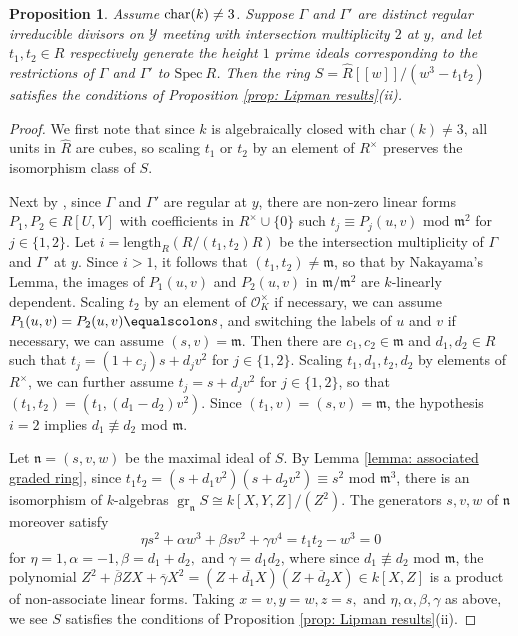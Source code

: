 \documentclass[12pt]{amsart}
\numberwithin{equation}{section}
\newtheorem{prop}[equation]{Proposition}
\theoremstyle{definition}
\newcommand{\n}{\mathfrak{n}}
\renewcommand{\O}{\mathcal{O}}
\newcommand{\Spec}{\mathrm{Spec} \ }
\renewcommand{\c}[1]{\overline{#1}}
\newcommand{\m}{\mathfrak{m}}
\newcommand{\Y}{\mathcal{Y}}
\newcommand{\tx}[1]{\text{#1}}
\DeclareMathOperator{\gr}{gr}
\begin{document}
\begin{prop}\label{prop: rational double points - Type II}
    Assume $\textup{char}(k)\neq 3$. Suppose $\Gamma$ and $\Gamma'$ are distinct regular irreducible divisors on $\Y$ meeting with intersection multiplicity $2$ at $y$, and let $t_1,t_2\in R$ respectively generate the height $1$ prime ideals corresponding to the restrictions of $\Gamma$ and $\Gamma'$ to $\Spec R$. Then the ring $S=\widehat{R}[[w]]/(w^3-t_1t_2)$ satisfies the conditions of Proposition \ref{prop: Lipman results}\textup{(ii)}.
\end{prop}
\begin{proof}
    We first note that since $k$ is algebraically closed with $\tx{char}(k)\neq 3$, all units in $\widehat{R}$ are cubes, so scaling $t_1$ or $t_2$ by an element of $R^\times$ preserves the isomorphism class of $S$.
    
    Next by \cite[Example 9.2.21]{Liu_book}, since $\Gamma$ and $\Gamma'$ are regular at $y$, there are non-zero linear forms $P_1,P_2\in R[U,V]$ with coefficients in $R^\times\cup\{0\}$ such $t_j\equiv P_j(u,v)\tx{ mod }\m^2$ for $j\in\{1,2\}$. Let $i=\tx{length}_R(R/(t_1,t_2)R)$ be the intersection multiplicity of $\Gamma$ and $\Gamma'$ at $y$. Since $i>1$, it follows that $(t_1,t_2)\neq\m$, so that by Nakayama's Lemma, the images of $P_1(u,v)$ and $P_2(u,v)$ in $\m/\m^2$ are $k$-linearly dependent. Scaling $t_2$ by an element of $\O_K^\times$ if necessary, we can assume $P_1(u,v)=P_2(u,v)\equalscolon s$, and switching the labels of $u$ and $v$ if necessary, we can assume $(s,v)=\m$. Then there are $c_1,c_2\in\m$ and $d_1,d_2\in R$ such that $t_j=(1+c_j)s+d_jv^2$ for $j\in\{1,2\}$. Scaling $t_1,d_1,t_2,d_2$ by elements of $R^\times$, we can further assume $t_j=s+d_jv^2$ for $j\in\{1,2\}$, so that $(t_1,t_2)=(t_1,(d_1-d_2)v^2)$. Since $(t_1,v)=(s,v)=\m$, the hypothesis $i=2$ implies $d_1\not\equiv d_2$ mod $\m$.

    Let $\n=(s,v,w)$ be the maximal ideal of $S$. By Lemma \ref{lemma: associated graded ring}, since $t_1t_2=(s+d_1v^2)(s+d_2v^2)\equiv s^2\tx{ mod }\m^3$, there is an isomorphism of $k$-algebras $\gr_\n S\cong k[X,Y,Z]/(Z^2)$. The generators $s,v,w$ of $\n$ moreover satisfy \[\eta s^2+\alpha w^3+\beta sv^2+\gamma v^4=t_1t_2-w^3=0\]
    for $\eta=1,\alpha=-1,\beta=d_1+d_2,$ and $\gamma=d_1d_2$, where since $d_1\not\equiv d_2$ mod $\m$, the polynomial $Z^2+\c{\beta} ZX+\c{\gamma} X^2=(Z+\c{d_1}X)(Z+\c{d}_2X)\in k[X,Z]$ is a product of non-associate linear forms. Taking $x=v,y=w,z=s,$ and $\eta,\alpha,\beta,\gamma$ as above, we see $S$ satisfies the conditions of Proposition \ref{prop: Lipman results}(ii).
\end{proof}
\end{document}
